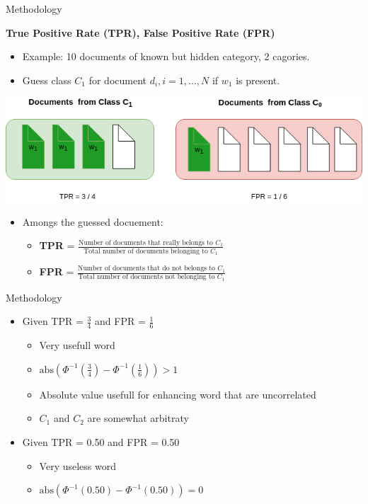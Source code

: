 \begin{frame}[label=metho]{Methodology}

	\textbf{True Positive Rate (TPR), False Positive Rate (FPR)}
	\begin{itemize}
		\item Example: 10 documents of known but hidden category, 2 cagories.
		\item Guess class $C_1$ for document $d_i, i = 1,...,N$ if $w_1$ is present.	
\end{itemize}

			\includegraphics[width=\textwidth]{images/TPRFPR_example.png}

	\begin{itemize}
		
			\item Amongs the guessed docuement:
		\begin{itemize}

			\item \textbf{TPR} = $\frac{\textrm{Number of documents that really belongs to } C_1}{\textrm{Total number of documents belonging to } C_1} $
			\item \textbf{FPR} = $\frac{\textrm{Number of documents that do not belongs to } C_1}{\textrm{Total number of documents not belonging to } C_1} $
		\end{itemize}
	\end{itemize}

			


\end{frame}

\begin{frame}[label=metho]{Methodology}
		\begin{itemize}
		\item Given TPR = $\frac{3}{4}$ and FPR = $\frac{1}{6}$
			\begin{itemize}
				\item Very usefull word
				\item $\textrm{abs}(\Phi^{-1}(\frac{3}{4}) - \Phi^{-1}(\frac{1}{6}) ) > 1$ 
				\item Absolute value usefull for enhancing word that are uncorrelated
				\item $C_1$ and $C_2$ are somewhat arbitraty
			\end{itemize}
		\item Given TPR = 0.50 and FPR = 0.50
		\begin{itemize}
			\item Very useless word
			\item $\textrm{abs}(\Phi^{-1}(0.50) - \Phi^{-1}(0.50) ) = 0$ 
		\end{itemize}
	
	\end{itemize}
\end{frame}

